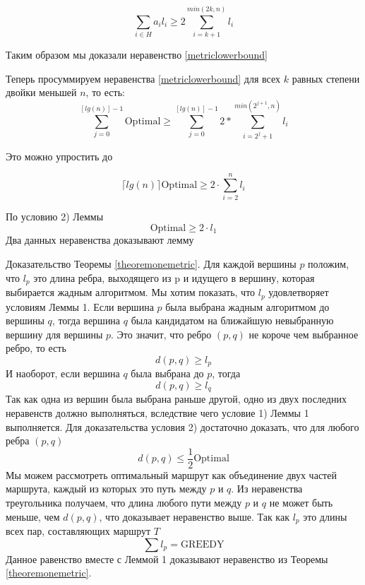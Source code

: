 \documentclass[a4paper, 14pt]{extarticle}
\numberwithin{equation}{section}
\begin{document}
\begin{equation}
	\sum_{i \in H} a_i l_i \geqslant 2 \sum_{i=k+1}^{min(2k, n)} l_i
	\label{sum}
\end{equation}

Таким образом мы доказали неравенство \eqref{metriclowerbound}

Теперь просуммируем неравенства \eqref{metriclowerbound} для всех $k$ равных степени двойки меньшей $n$, то есть:
\begin{equation*}
\sum_{j=0}^{[lg(n)]-1} \mathrm{Optimal} \geqslant \sum_{j=0}^{[lg(n)]-1} 2* \sum_{i=2^j+1}^{min(2^{j+1}, n)} l_i
\end{equation*}

Это можно упростить до

\begin{equation*}
\lceil lg(n) \rceil \mathrm{Optimal} \geqslant 2\cdot \sum_{i=2}^{n} l_i
\end{equation*}

По условию 2) Леммы
\begin{equation*}
\mathrm{Optimal} \geqslant 2 \cdot l_1
\end{equation*}
Два данных неравенства доказывают лемму

Доказательство Теоремы \ref{theoremonemetric}. Для каждой  вершины $p$ положим, что $l_p$ это длина ребра, выходящего из p и идущего в вершину, которая выбирается жадным алгоритмом. Мы хотим показать, что $l_p$ удовлетворяет условиям Леммы 1. Если вершина $p$ была выбрана жадным алгоритмом до вершины $q$, тогда вершина $q$ была кандидатом на ближайшую невыбранную вершину для вершины $p$. Это значит, что ребро $(p,q)$ не короче чем выбранное ребро, то есть
\begin{equation*}
d(p,q) \geqslant l_p
\end{equation*}
И наоборот, если вершина $q$ была выбрана до $p$, тогда
\begin{equation*}
d(p,q) \geqslant l_q
\end{equation*}
Так как одна из вершин была выбрана раньше другой, одно из двух последних неравенств должно выполняться, вследствие чего  условие 1) Леммы 1 выполняется. Для доказательства условия 2) достаточно доказать, что для любого ребра $(p,q)$
\begin{equation*}
d(p,q) \leqslant \frac{1}{2} \mathrm{Optimal}
\end{equation*}
Мы можем рассмотреть оптимальный маршрут как объединение двух частей маршрута, каждый из которых это путь между $p$ и $q$. Из неравенства треугольника получаем, что длина любого пути между $p$ и $q$ не может быть меньше, чем $d(p,q)$, что доказывает неравенство выше. Так как $l_p$ это длины всех пар, составляющих маршрут $T$
\begin{equation*}
\sum l_p = \mathrm{GREEDY}
\end{equation*}
Данное равенство вместе с Леммой 1 доказывают неравенство из Теоремы \ref{theoremonemetric}.\\
\end{document}
